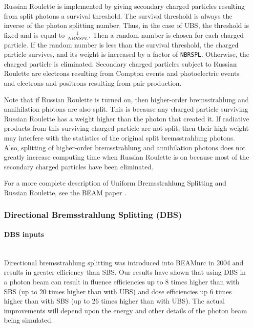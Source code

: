 \documentclass[12pt,twoside]{article}
\begin{document}
Russian Roulette is implemented by giving secondary charged particles
resulting from split photons a survival threshold.  The survival threshold
is always the inverse of the photon splitting number.  Thus, in the case of
UBS, the threshold is fixed and is equal to $\frac{1}{NBRSPL}$.
Then a random number is chosen for each charged
particle.
If the random number is less than the survival threshold,
the charged particle survives, and its weight is increased by
a factor of {\tt NBRSPL}.
Otherwise, the charged particle is eliminated.
Secondary charged particles subject to Russian Roulette are electrons
resulting from Compton events and photoelectric events and electrons
and positrons resulting from pair production.

Note that if Russian Roulette is turned on, then higher-order
bremsstrahlung and annihilation photons are also
split.  This is because any charged particle
surviving Russian
Roulette has a weight higher than the photon that created it.  If
radiative products from this surviving charged particle are not split, then
their high weight may interfere with the statistics of the original
split bremsstrahlung photons.  Also, splitting of
higher-order bremsstrahlung and annihilation photons does not greatly increase
computing time when Russian Roulette is on because most of the secondary
charged particles have been eliminated.

For a more complete description of Uniform Bremsstrahlung Splitting and Russian
Roulette, see the BEAM paper \cite{Ro95}.


\subsubsection{Directional Bremsstrahlung Splitting (DBS)}
\label{dbssect}
\paragraph{DBS inputs}\mbox{}\\
Directional bremsstrahlung splitting was introduced into
BEAMnrc in 2004 and results in greater efficiency than SBS\cite{Ka04a}.
Our results have shown that using DBS in a photon beam can
result in fluence efficiencies up to 8 times higher than with
SBS (up to 20 times higher than with UBS) and dose efficiencies up
6 times higher than with SBS (up to 26 times higher than with UBS).  The
actual improvements will depend upon the energy and other details of
the photon beam being simulated.
\end{document}
